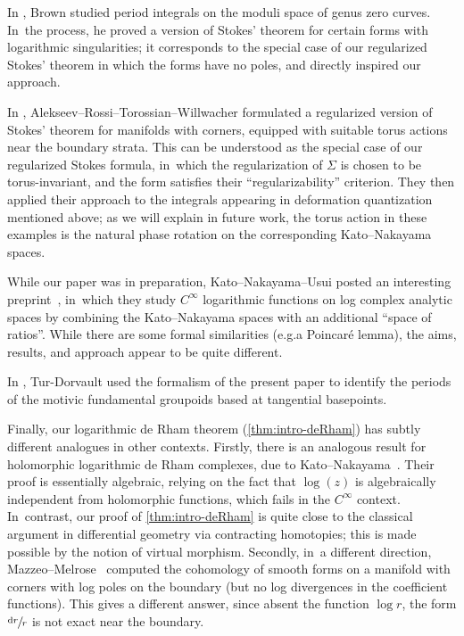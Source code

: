 \documentclass[10pt]{amsart}
\newcommand{\dslog}[1]{\sfrac{\dd#1}{#1}}
\theoremstyle{definition}
\theoremstyle{remark}
\newcommand{\dd}{\mathrm{d}}
\newcommand{\Sig}{\Sigma}
\providecommand{\eg}{e.g.}\providecommand{\ie}{i.e.}
\begin{document}
In \cite{Brown2009}, Brown studied period integrals on the moduli space of genus zero curves. In~the process, he proved a version of Stokes' theorem for certain forms with logarithmic singularities; it corresponds to the special case of our regularized Stokes' theorem in which the forms have no poles, and directly inspired our approach.

In \cite{AlekseevRossiTorossianWillwacher:Logs}, Alekseev--Rossi--Torossian--Willwacher formulated a regularized version of Stokes' theorem for manifolds with corners, equipped with suitable torus actions near the boundary strata. This can be understood as the special case of our regularized Stokes formula, in~which the regularization of $\Sig$ is chosen to be torus-invariant, and the form satisfies their ``regularizability'' criterion. They then applied their approach to the integrals appearing in deformation quantization mentioned above; as we will explain in future work, the torus action in these examples is the natural phase rotation on the corresponding Kato--Nakayama spaces.

While our paper was in preparation, Kato--Nakayama--Usui posted an interesting preprint~\cite{KatoNakayamaUsui}, in~which they study $C^\infty$ logarithmic functions on log complex analytic spaces by combining the Kato--Nakayama spaces with an additional ``space of ratios''. While there are some formal similarities (\eg a Poincaré lemma), the aims, results, and approach appear to be quite different.

In \cite{turdorvault}, Tur-Dorvault used the formalism of the present paper to identify the periods of the motivic fundamental groupoids based at tangential basepoints.

Finally, our logarithmic de Rham theorem (\autoref{thm:intro-deRham}) has subtly different analogues in other contexts. Firstly, there is an analogous result for holomorphic logarithmic de Rham complexes, due to Kato--Nakayama~\cite{KatoNakayama}. Their proof is essentially algebraic, relying on the fact that $\log(z)$ is algebraically independent from holomorphic functions, which fails in the $C^\infty$ context. In~contrast, our proof of \autoref{thm:intro-deRham} is quite close to the classical argument in differential geometry via contracting homotopies; this is made possible by the notion of virtual morphism. Secondly, in~a different direction, Mazzeo--Melrose~\cite[\S2.16]{Melrose1993} computed the cohomology of smooth forms on a manifold with corners with log poles on the boundary (but no log divergences in the coefficient functions). This gives a different answer, since absent the function $\log r$, the form $\dslog r$ is not exact near the boundary.
\end{document}
